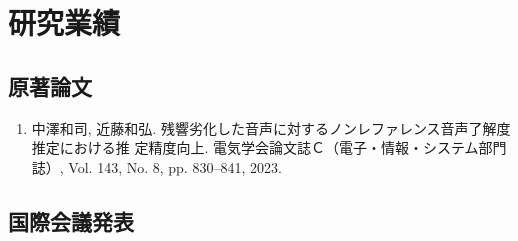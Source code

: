 \documentclass[uplatex,dvipdfmx,a4paper,11pt]{jsreport}
\begin{document}
\chapter*{研究業績}

\section*{原著論文}
\begin{enumerate}
    \item 中澤和司, 近藤和弘. 残響劣化した音声に対するノンレファレンス音声了解度推定における推
定精度向上. 電気学会論文誌Ｃ（電子・情報・システム部門誌）, Vol. 143, No. 8, pp. 830–841,
2023.
\end{enumerate}


\section*{国際会議発表}
\end{document}
